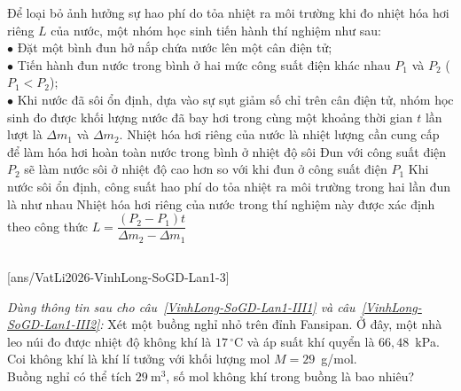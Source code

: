	\begin{ex}%
		Để loại bỏ ảnh hưởng sự hao phí do tỏa nhiệt ra môi trường khi đo nhiệt hóa hơi riêng $L$ của nước, một nhóm học sinh tiến hành thí nghiệm như sau:\\
		$\bullet$ Đặt một bình đun hở nắp chứa nước lên một cân điện tử;\\
		$\bullet$ Tiến hành đun nước trong bình ở hai mức công suất điện khác nhau $P_1$ và $P_2$ ($P_1<P_2$);\\
		$\bullet$ Khi nước đã sôi ổn định, dựa vào sự sụt giảm số chỉ trên cân điện tử, nhóm học sinh đo được khối lượng nước đã bay hơi trong cùng một khoảng thời gian $t$ lần lượt là $\Delta m_1$ và $\Delta m_2$.
		\choiceTFt
		{Nhiệt hóa hơi riêng của nước là nhiệt lượng cần cung cấp để làm hóa hơi hoàn toàn nước trong bình ở nhiệt độ sôi}
		{Đun với công suất điện $P_2$ sẽ làm nước sôi ở nhiệt độ cao hơn so với khi đun ở công suất điện $P_1$}
		{\True Khi nước sôi ổn định, công suất hao phí do tỏa nhiệt ra môi trường trong hai lần đun là như nhau}
		{\True Nhiệt hóa hơi riêng của nước trong thí nghiệm này được xác định theo công thức $L=\dfrac{(P_2-P_1)t}{\Delta m_2-\Delta m_1}$}
	\end{ex}

	\subsection*{}
	\setcounter{ex}{0}
	[ans/VatLi2026-VinhLong-SoGD-Lan1-3]

	\begin{ex}%
		\label{VinhLong-SoGD-Lan1-III1}\textit{Dùng thông tin sau cho câu~\ref{VinhLong-SoGD-Lan1-III1} và câu~\ref{VinhLong-SoGD-Lan1-III2}:} Xét một buồng nghỉ nhỏ trên đỉnh Fansipan. Ở đây, một nhà leo núi đo được nhiệt độ không khí là $17\,^\circ\text{C}$ và áp suất khí quyển là $66{,}48$~kPa. Coi không khí là khí lí tưởng với khối lượng mol $M=29$~g/mol.\\
		Buồng nghỉ có thể tích $29~\text{m}^3$, số mol không khí trong buồng là bao nhiêu?
		\par
	\end{ex}

